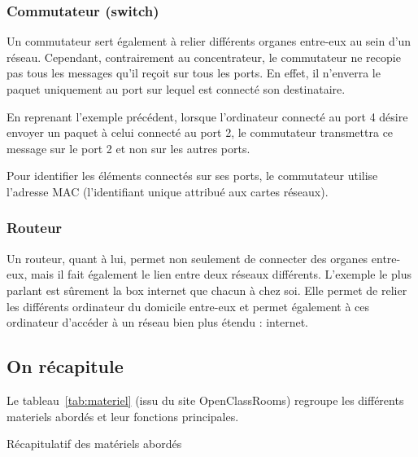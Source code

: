 \subsubsection{Commutateur (switch)}
\label{sec:commutateur}
Un commutateur sert également à relier différents organes entre-eux au sein d'un réseau. Cependant, contrairement au concentrateur, le commutateur ne recopie pas tous les messages qu'il reçoit sur tous les ports. En effet, il n'enverra le paquet uniquement au port sur lequel est connecté son destinataire.

En reprenant l'exemple précédent, lorsque l'ordinateur connecté au port 4 désire envoyer un paquet à celui connecté au port 2, le commutateur transmettra ce message sur le port 2 et non sur les autres ports.

Pour identifier les éléments connectés sur ses ports, le commutateur utilise l'adresse MAC (l'identifiant unique attribué aux cartes réseaux).

\subsubsection{Routeur}
\label{sec:routeur}
Un routeur, quant à lui, permet non seulement de connecter des organes entre-eux, mais il fait également le lien entre deux réseaux différents. L'exemple le plus parlant est sûrement la box internet que chacun à chez soi. Elle permet de relier les différents ordinateur du domicile entre-eux et permet également à ces ordinateur d'accéder à un réseau bien plus étendu : internet.


\subsection{On récapitule}

Le tableau~\ref{tab:materiel} (issu du site OpenClassRooms) regroupe les différents materiels abordés et leur fonctions principales.

\begin{table}[h!t]
\centering
  
  \caption{Récapitulatif des matériels abordés}
  \label{tab:materiel}
\end{table}

